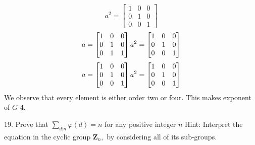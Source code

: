 \begin{mdframed}[style=darkAnswer,frametitle={Joe Starr}]
\begin{itemize}
{$$    a^{ 2 }={ \begin{bmatrix}1&0&0\\0&1&0\\0&0&1\end{bmatrix} }
    $$
    $$a= \begin{bmatrix}1&0&0\\0&1&0\\0&1&1\end{bmatrix} \\
    a^{ 2 }={ \begin{bmatrix}1&0&0\\0&1&0\\0&0&1\end{bmatrix} }
    $$
    $$a= \begin{bmatrix}1&0&0\\0&1&0\\0&0&1\end{bmatrix} \\
    a^{ 2 }={ \begin{bmatrix}1&0&0\\0&1&0\\0&0&1\end{bmatrix} }
    $$
    We observe that every element is either order two or four. 
    This makes exponent of $G$ 4. 
  }
\end{itemize}
\end{mdframed}
\newpage
\begin{mdframed}[style=darkQuesion]
  19. Prove that $\sum_{d | n} \varphi(d)=n$ for any positive integer $n$ 
  Hint: Interpret the equation in the cyclic group $\mathbf{Z}_{n},$ 
  by considering all of its sub-groups.
\end{mdframed}
\begin{mdframed}[style=darkAnswer,frametitle={Joe Starr}]
\end{mdframed}
\newpage
